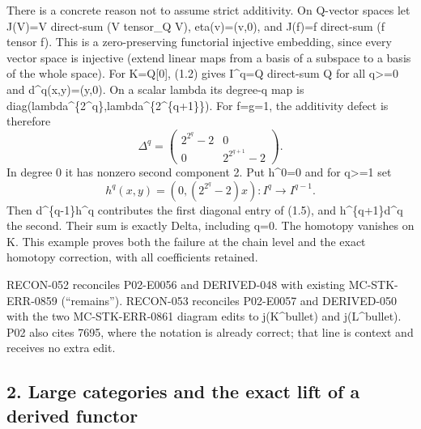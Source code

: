\documentclass[11pt]{article}
\begin{document}
There is a concrete reason not to assume strict additivity. On Q-vector spaces let J(V)\allowbreak{}\allowbreak{}=V direct-sum (V tensor\_\allowbreak{}Q V)\allowbreak{},\allowbreak{} eta(v)\allowbreak{}\allowbreak{}=(v,\allowbreak{}0)\allowbreak{},\allowbreak{} and J(f)\allowbreak{}\allowbreak{}=f direct-sum (f tensor f)\allowbreak{}. This is a zero-preserving functorial injective embedding,\allowbreak{} since every vector space is injective (extend linear maps from a basis of a subspace to a basis of the whole space)\allowbreak{}. For K\allowbreak{}=Q[0]\allowbreak{},\allowbreak{} (1.2)\allowbreak{} gives I\textasciicircum{}q\allowbreak{}=Q direct-sum Q for all q>\allowbreak{}=0 and d\textasciicircum{}q(x,\allowbreak{}y)\allowbreak{}\allowbreak{}=(y,\allowbreak{}0)\allowbreak{}. On a scalar lambda its degree-q map is diag(lambda\textasciicircum{}\{2\textasciicircum{}q\},\allowbreak{}lambda\textasciicircum{}\{2\textasciicircum{}\{q\allowbreak{}+1\}\})\allowbreak{}. For f\allowbreak{}=g\allowbreak{}=1,\allowbreak{} the additivity defect is therefore \[
 \Delta^q=
 \begin{pmatrix}2^{2^q}-2&0\\0&2^{2^{q+1}}-2\end{pmatrix}.
                                                               \tag{1.5}
\] In degree 0 it has nonzero second component 2. Put h\textasciicircum{}0\allowbreak{}=0 and for q>\allowbreak{}=1 set \[
 h^q(x,y)=(0,(2^{2^q}-2)x):I^q\longrightarrow I^{q-1}.
                                                               \tag{1.6}
\] Then d\^{}\{q-1\}h\^{}q contributes the first diagonal entry of (1.5)\allowbreak{},\allowbreak{} and h\textasciicircum{}\{q\allowbreak{}+1\}d\textasciicircum{}q the second. Their sum is exactly Delta,\allowbreak{} including q\allowbreak{}=0. The homotopy vanishes on K. This example proves both the failure at the chain level and the exact homotopy correction,\allowbreak{} with all coefficients retained.

RECON-052 reconciles P02-E0056 and DERIVED-048 with existing MC-STK-ERR-0859 (“remains”)\allowbreak{}. RECON-053 reconciles P02-E0057 and DERIVED-050 with the two MC-STK-ERR-0861 diagram edits to j(K\textasciicircum{}bullet)\allowbreak{} and j(L\textasciicircum{}bullet)\allowbreak{}. P02 also cites 7695,\allowbreak{} where the notation is already correct; that line is context and receives no extra edit.

\subsection{2. Large categories and the exact lift of a derived functor}\label{proofs-7589-8350-large-categories-and-the-exact-lift-of-a-derived-functor}
\end{document}
